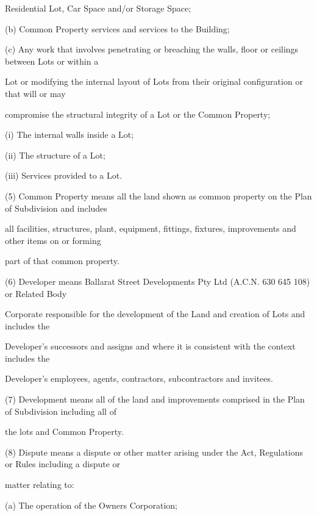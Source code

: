 \documentclass{article}
\begin{document}
{\fontsize{10.02}{1}Residential Lot, Car Space and/or Storage Space; }

{\fontsize{9.962}{1}(b) Common Property services and services to the Building; }

{\fontsize{9.962}{1}(c) Any work that involves penetrating or breaching the walls, floor or ceilings between Lots or within a }

{\fontsize{10.02}{1}Lot or modifying the internal layout of Lots from their original configuration or that will or may }

{\fontsize{10.02}{1}compromise the structural integrity of a Lot or the Common Property; }

{\fontsize{9.962}{1}(i) The internal walls inside a Lot; }

\newpage

{\fontsize{9.962}{1}(ii) The structure of a Lot; }

{\fontsize{9.962}{1}(iii) Services provided to a Lot. }

{\fontsize{9.962}{1}(5) Common Property means all the land shown as common property on the Plan of Subdivision and includes }

{\fontsize{10.02}{1}all facilities, structures, plant, equipment, fittings, fixtures, improvements and other items on or forming }

{\fontsize{10.02}{1}part of that common property. }

{\fontsize{9.962}{1}(6) Developer means Ballarat Street Developments Pty Ltd (A.C.N. 630 645 108) or Related Body }

{\fontsize{10.02}{1}Corporate responsible for the development of the Land and creation of Lots and includes the }

{\fontsize{10.02}{1}Developer’s successors and assigns and where it is consistent with the context includes the }

{\fontsize{10.02}{1}Developer’s employees, agents, contractors, subcontractors and invitees. }

{\fontsize{9.962}{1}(7) Development means all of the land and improvements comprised in the Plan of Subdivision including all of }

{\fontsize{10.02}{1}the lots and Common Property. }

{\fontsize{9.962}{1}(8) Dispute means a dispute or other matter arising under the Act, Regulations or Rules including a dispute or }

{\fontsize{10.02}{1}matter relating to: }

{\fontsize{9.962}{1}(a) The operation of the Owners Corporation; }
\end{document}
